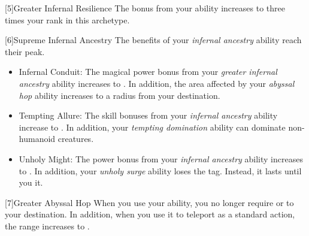     [5]{Greater Infernal Resilience}  The bonus from your  ability increases to three times your rank in this archetype.

      [6]{Supreme Infernal Ancestry} The benefits of your \textit{infernal ancestry} ability reach their peak.
      \begin{itemize}
        \item Infernal Conduit: The magical power bonus from your \textit{greater infernal ancestry} ability increases to .
          In addition, the area affected by your \textit{abyssal hop} ability increases to a \medarea radius from your destination.
        \item Tempting Allure: The skill bonuses from your \textit{infernal ancestry} ability increase to .
          In addition, your \textit{tempting domination} ability can dominate non-humanoid creatures.
        \item Unholy Might: The power bonus from your \textit{infernal ancestry} ability increases to .
          In addition, your \textit{unholy surge} ability loses the  tag.
          Instead, it lasts until you  it.
      \end{itemize}

      [7]{Greater Abyssal Hop} When you use your  ability, you no longer require  or  to your destination.
      In addition, when you use it to teleport as a standard action, the range increases to \distrange.




